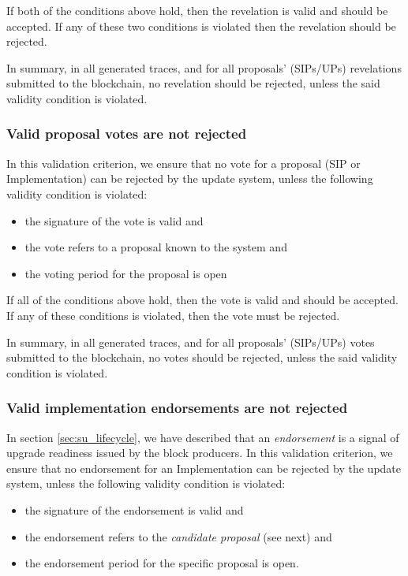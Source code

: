 If both of the conditions above hold,  then the revelation is valid and should
be accepted. If any of these two conditions is violated then the revelation 
should
be rejected.

In summary, in all generated traces, and for all proposals'
(SIPs/UPs) revelations submitted to the blockchain, no revelation should be 
rejected,
unless the said validity condition is violated.

\subsubsection{Valid proposal votes are not 
rejected}\label{vc:votes_not_rejected}
In this validation criterion, we ensure that no vote for a proposal (SIP or
Implementation) can be rejected by the update system, unless the
following validity condition is violated:
\begin{itemize}
	\item the signature of the vote is valid and
	\item the vote refers to a proposal known to the system and
	\item the voting period for the proposal is open
\end{itemize}

If all of the conditions above hold, then the vote is valid and should be
accepted. If any of these conditions is violated, then the vote must be
rejected.

In summary, in all generated traces, and for all proposals'
(SIPs/UPs) votes submitted to the blockchain, no votes should be rejected,
unless the said validity condition is violated.

\subsubsection{Valid implementation endorsements are not
	rejected}\label{vc:endorsements_not_rejected}

In section \ref{sec:su_lifecycle}, we have described that an \emph{endorsement} 
is a signal of upgrade readiness issued by the block producers. In this 
validation criterion, we ensure that no endorsement for an
Implementation can be rejected by the update system, unless the
following validity condition is violated:

\begin{itemize}
	\item the signature of the endorsement is valid and
	\item the endorsement refers to the \emph{candidate proposal} (see next) and
	\item the endorsement period for the specific proposal is open.
\end{itemize}

